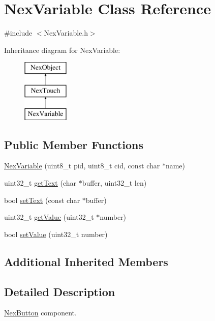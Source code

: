\hypertarget{class_nex_variable}{\section{Nex\+Variable Class Reference}
\label{class_nex_variable}
}


{\ttfamily \#include $<$Nex\+Variable.\+h$>$}

Inheritance diagram for Nex\+Variable\+:\begin{figure}[H]
\begin{center}
\leavevmode
\includegraphics[height=3.000000cm]{class_nex_variable}
\end{center}
\end{figure}
\subsection*{Public Member Functions}
\begin{DoxyCompactItemize}
\item 
\hyperlink{class_nex_variable_a7d36d19e14c991872fb1547f3ced09b2}{Nex\+Variable} (uint8\+\_\+t pid, uint8\+\_\+t cid, const char $\ast$name)
\item 
uint32\+\_\+t \hyperlink{class_nex_variable_ab4d12f14dcff3f6930a2bdf5e1f3d259}{get\+Text} (char $\ast$buffer, uint32\+\_\+t len)
\item 
bool \hyperlink{class_nex_variable_aab59ac44eb0804664a03c09932be70eb}{set\+Text} (const char $\ast$buffer)
\item 
uint32\+\_\+t \hyperlink{class_nex_variable_aff06d16d022876c749d3e30f020b1557}{get\+Value} (uint32\+\_\+t $\ast$number)
\item 
bool \hyperlink{class_nex_variable_a9da9d4a74f09e1787e4e4562da1e4833}{set\+Value} (uint32\+\_\+t number)
\end{DoxyCompactItemize}
\subsection*{Additional Inherited Members}


\subsection{Detailed Description}
\hyperlink{class_nex_button}{Nex\+Button} component.

